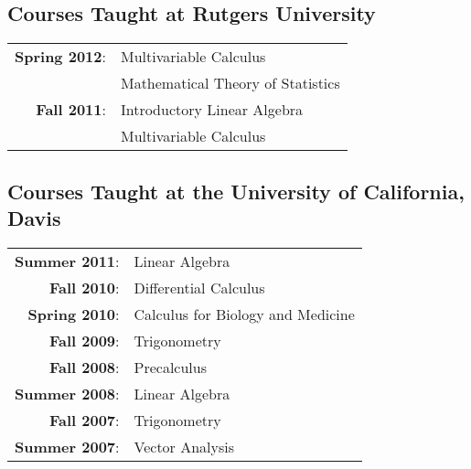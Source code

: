 \documentclass[letterpaper]{article}
\renewenvironment{itemize}{
  \begin{list}{}{
    \setlength{\leftmargin}{1em}
  }
}{
  \end{list}
}
\begin{document}
   
   

 
   
   
   
\subsection*{Courses Taught at Rutgers University}   
   \begin{tabular}{r l}
   	{\bf Spring 2012}: & Multivariable Calculus \\
			     	& Mathematical Theory of Statistics \\
	{\bf Fall 2011}: & Introductory Linear Algebra \\
				& Multivariable Calculus
   \end{tabular}

\subsection*{Courses Taught at the University of California, Davis}
    \begin{tabular}{r l}
    	{\bf Summer 2011}: & Linear Algebra \\
	{\bf Fall 2010}: & Differential Calculus \\
	{\bf Spring 2010}: & Calculus for Biology and Medicine \\
	{\bf Fall 2009}: & Trigonometry \\
	{\bf Fall 2008}: & Precalculus \\
	{\bf Summer 2008}: & Linear Algebra \\
	{\bf Fall 2007}: & Trigonometry \\
	{\bf Summer 2007}: & Vector Analysis
   \end{tabular}
\end{document}
